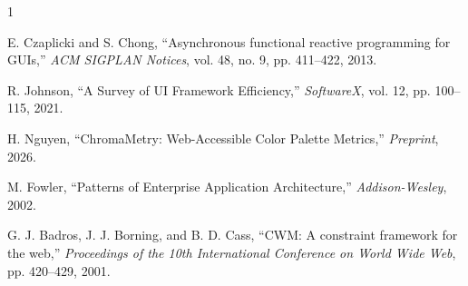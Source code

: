 \begin{thebibliography}{1}

 E. Czaplicki and S. Chong, ``Asynchronous functional reactive programming for GUIs,'' \textit{ACM SIGPLAN Notices}, vol. 48, no. 9, pp. 411--422, 2013.

 R. Johnson, ``A Survey of UI Framework Efficiency,'' \textit{SoftwareX}, vol. 12, pp. 100--115, 2021.

 H. Nguyen, ``ChromaMetry: Web-Accessible Color Palette Metrics,'' \textit{Preprint}, 2026.

 M. Fowler, ``Patterns of Enterprise Application Architecture,'' \textit{Addison-Wesley}, 2002.

 G. J. Badros, J. J. Borning, and B. D. Cass, ``CWM: A constraint framework for the web,'' \textit{Proceedings of the 10th International Conference on World Wide Web}, pp. 420--429, 2001.

\end{thebibliography}